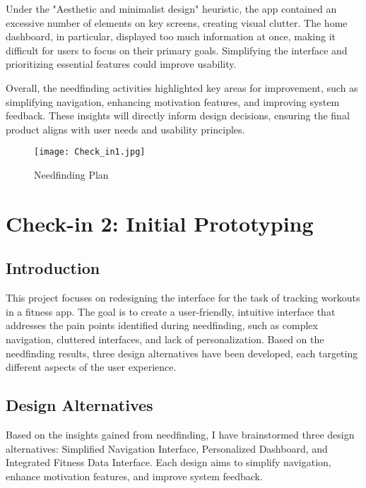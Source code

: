 \documentclass[
	letterpaper, %
]{jdf}
\begin{document}
Under the "Aesthetic and minimalist design" heuristic, the app contained an excessive number of elements on key screens, creating visual clutter. The home dashboard, in particular, displayed too much information at once, making it difficult for users to focus on their primary goals. Simplifying the interface and prioritizing essential features could improve usability.

Overall, the needfinding activities highlighted key areas for improvement, such as simplifying navigation, enhancing motivation features, and improving system feedback. These insights will directly inform design decisions, ensuring the final product aligns with user needs and usability principles.

\begin{figure}
    \centering
    \texttt{[image: Check\_in1.jpg]}
    \caption{Needfinding Plan}
    \label{fig:enter-label}
\end{figure}

\newpage

\section{Check-in 2: Initial Prototyping}
\subsection{Introduction}
This project focuses on redesigning the interface for the task of tracking workouts in a fitness app. The goal is to create a user-friendly, intuitive interface that addresses the pain points identified during needfinding, such as complex navigation, cluttered interfaces, and lack of personalization. Based on the needfinding results, three design alternatives have been developed, each targeting different aspects of the user experience.

\subsection{Design Alternatives}
Based on the insights gained from needfinding, I have brainstormed three design alternatives: Simplified Navigation Interface, Personalized Dashboard, and Integrated Fitness Data Interface. Each design aims to simplify navigation, enhance motivation features, and improve system feedback.
\end{document}
